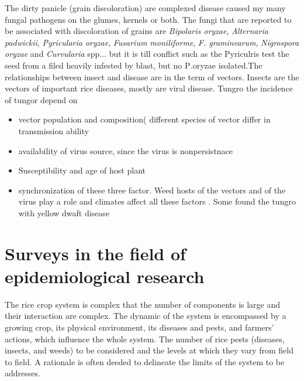 The dirty panicle (grain discoloration) are complexed disease caused my many fungal pathogens on the glumes, kernels or both. The fungi that are reported to be associated with discoloration of grains are \textit{Bipolaris oryzae}, \textit{Alternaria padwickii}, \textit{Pyricularia oryzae}, \textit{Fusarium moniliforme}, \textit{F. graminearum}, \textit{Nigrospora oryzae} and \textit{Curvularia} spp..\cite{ouricedisease}. but it is till conflict such as the Pyriculris test the seed from a filed heavily infested by blast, but no P\textit.{oryzae} isolated.The relationships between insect and disease are in the term of vectors. Insects are the vectors of important rice diseases, mostly are viral disease. Tungro the incidence of tungor depend on 
\begin{itemize}
\item vector population and composition( different species of vector differ in transmission ability 
\item availability of virus source, since the virus is nonpersistnace
\item Susceptibility and age of host plant 
\item synchronization of these three factor. 
Weed hosts of the vectors and of the virus play a role and climates affect all these factors \cite{naganagoud2010studies}. Some found the tungro with yellow dwaft disease \cite{ouricedisease}
\end{itemize}

\section*{Surveys in the field of epidemiological research}
The rice crop system is complex that the number of components is large and their interaction are complex. The dynamic of the system is encompassed by a growing crop, its physical environment, its diseases and pests, and farmers' actions, which influence the whole system. The number of rice pests (diseases, insects, and weeds) to be considered and the levels at which they vary from field to field. A rationale is often deeded to delineate the limits of the system to be addresses.

